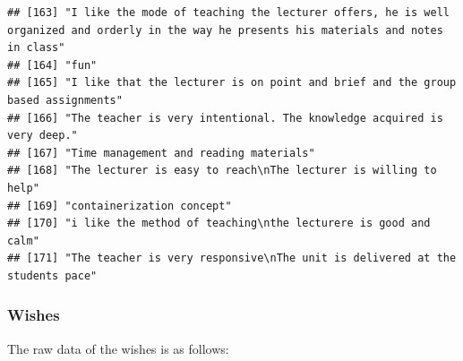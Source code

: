 \documentclass[
]{article}
\begin{document}
\begin{verbatim}
## [163] "I like the mode of teaching the lecturer offers, he is well organized and orderly in the way he presents his materials and notes in class"                                                                                                        
## [164] "fun"                                                                                                                                                                                                                                              
## [165] "I like that the lecturer is on point and brief and the group based assignments"                                                                                                                                                                   
## [166] "The teacher is very intentional. The knowledge acquired is very deep."                                                                                                                                                                            
## [167] "Time management and reading materials"                                                                                                                                                                                                            
## [168] "The lecturer is easy to reach\nThe lecturer is willing to help"                                                                                                                                                                                   
## [169] "containerization concept"                                                                                                                                                                                                                         
## [170] "i like the method of teaching\nthe lecturere is good and calm"                                                                                                                                                                                    
## [171] "The teacher is very responsive\nThe unit is delivered at the students pace"
\end{verbatim}

\newpage

\subsubsection{Wishes}\label{wishes}

The raw data of the wishes is as follows:
\end{document}
